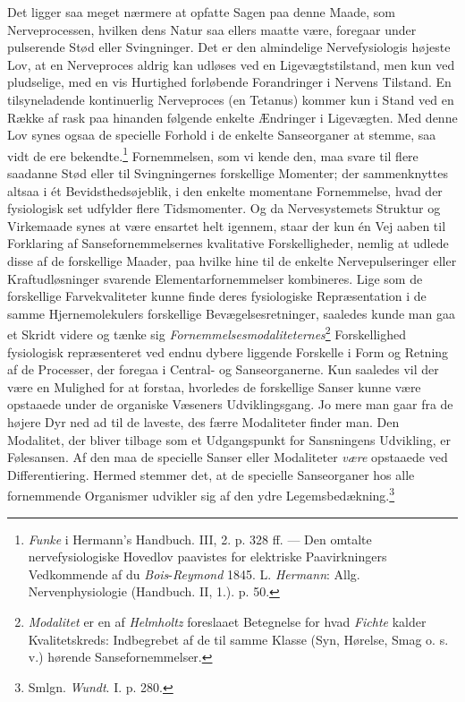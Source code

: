 \documentclass[12pt,a4paper,openany]{book}
\newcommand{\opage}[1]{\marginnote{\footnotesize\textit{[#1]}}}
\begin{document}
Det ligger saa meget nærmere at opfatte Sagen paa denne Maade, som
Nerveprocessen, hvilken dens Natur saa ellers maatte være, foregaar
under pulserende Stød eller Svingninger. Det er den almindelige
Nervefysiologis højeste Lov, at en Nerveproces aldrig kan udløses ved en
Ligevægtstilstand, men kun ved pludselige, med en vis Hurtighed
forløbende Forandringer i Nervens Tilstand. En tilsyneladende
kontinuerlig Nerveproces (en Tetanus) kommer kun i Stand ved en Række af
rask paa hinanden følgende enkelte Ændringer i Ligevægten. Med denne Lov
synes ogsaa de specielle Forhold i de enkelte Sanseorganer at stemme,
saa vidt de ere bekendte.\footnote[2]{\emph{Funke} i Hermann’s Handbuch.
III, 2. p. 328 ff. --- Den omtalte nervefysiologiske Hovedlov paavistes
for elektriske Paavirkningers Vedkommende af du
\emph{Bois}-\emph{Reymond} 1845. L. \emph{Hermann}: Allg.
Nervenphysiologie (Handbuch. II, 1.). p. 50.} Fornemmelsen, som vi kende
den, maa svare til flere saadanne Stød eller til Svingningernes
forskellige Momenter; der sammenknyttes altsaa i ét Bevidsthedsøjeblik,
i den enkelte momentane Fornemmelse, hvad der fysiologisk set udfylder
flere Tidsmomenter. Og da Nervesystemets Struktur og Virkemaade
\opage{127}synes at være ensartet helt igennem, staar der kun én Vej
aaben til Forklaring af Sansefornemmelsernes kvalitative
Forskelligheder, nemlig at udlede disse af de forskellige Maader, paa
hvilke hine til de enkelte Nervepulseringer eller Kraftudløsninger
svarende Elementarfornemmelser kombineres. Lige som de forskellige
Farvekvaliteter kunne finde deres fysiologiske Repræsentation i de samme
Hjernemolekulers forskellige Bevægelsesretninger, saaledes kunde man gaa
et Skridt videre og tænke sig
\emph{Fornemmelsesmodaliteternes}\footnote[1]{\emph{Modalitet} er en af
\emph{Helmholtz} foreslaaet Betegnelse for hvad \emph{Fichte} kalder
Kvalitetskreds: Indbegrebet af de til samme Klasse (Syn, Hørelse, Smag
o. s. v.) hørende Sansefornemmelser.} Forskellighed fysiologisk
repræsenteret ved endnu dybere liggende Forskelle i Form og Retning af
de Processer, der foregaa i Central- og Sanseorganerne. Kun saaledes vil
der være en Mulighed for at forstaa, hvorledes de forskellige Sanser
kunne være opstaaede under de organiske Væseners Udviklingsgang. Jo mere
man gaar fra de højere Dyr ned ad til de laveste, des færre Modaliteter
finder man. Den Modalitet, der bliver tilbage som et Udgangspunkt for
Sansningens Udvikling, er Følesansen. Af den maa de specielle Sanser
eller Modaliteter \emph{være} opstaaede ved Differentiering. Hermed
stemmer det, at de specielle Sanseorganer hos alle fornemmende
Organismer udvikler sig af den ydre Legemsbedækning.\footnote[2]{Smlgn.
\emph{Wundt}. I. p. 280.}
\end{document}
